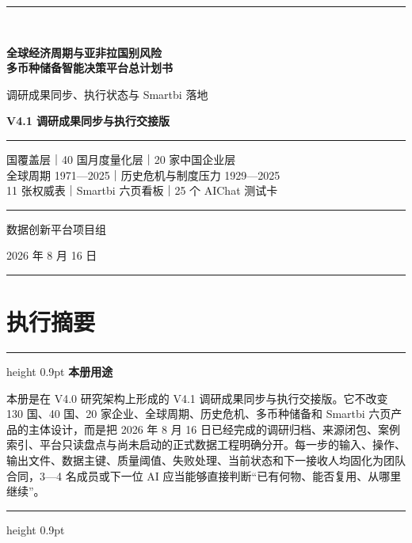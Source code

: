 \documentclass[UTF8,fontset=windows,12pt,openany]{ctexbook}
\newenvironment{decisionbox}[1][]{%
  \par\medskip\noindent\begin{center}\begin{minipage}{0.93\textwidth}%
  \color{OceanBlue}\hrule height 0.9pt\vspace{0.45em}%
  \textbf{#1}\par\smallskip\color{black}%
}{%
  \par\vspace{0.35em}\color{OceanBlue}\hrule height 0.9pt%
  \end{minipage}\end{center}\medskip%
}
\begin{document}
\begin{titlepage}
  \pagecolor{PaleBlue}
  \centering
  \vspace*{1.6cm}
  {\color{OceanBlue}\rule{0.88\textwidth}{1.5pt}}\\[1.05cm]
  {\Huge\bfseries\color{DeepNavy}全球经济周期与亚非拉国别风险\\[0.35cm]多币种储备智能决策平台总计划书\par}
  \vspace{0.7cm}
  {\LARGE\color{OceanBlue}调研成果同步、执行状态与 Smartbi 落地\par}
  \vspace{0.35cm}
  {\Large\bfseries\color{GoldLine}V4.1 调研成果同步与执行交接版\par}
  \vspace{1.0cm}
  \begin{minipage}{0.86\textwidth}
    \color{GoldLine}\rule{\textwidth}{0.9pt}\par\vspace{0.45cm}
    \color{black} 国覆盖层｜40 国月度量化层｜20 家中国企业层\\[0.25cm]
    全球周期 1971—2025｜历史危机与制度压力 1929—2025\\[0.25cm]
    11 张权威表｜Smartbi 六页看板｜25 个 AIChat 测试卡
    \vspace{0.45cm}\par\color{GoldLine}\rule{\textwidth}{0.9pt}
  \end{minipage}
  \vfill
  {\large 数据创新平台项目组\par}
  \vspace{0.25cm}
  {\large 2026 年 8 月 16 日\par}
  \vspace{0.75cm}
  {\color{OceanBlue}\rule{0.88\textwidth}{1.5pt}}
  \nopagecolor
\end{titlepage}

\frontmatter

\chapter*{执行摘要}

\begin{decisionbox}[本册用途]
本册是在 V4.0 研究架构上形成的 V4.1 调研成果同步与执行交接版。它不改变 130 国、40 国、20 家企业、全球周期、历史危机、多币种储备和 Smartbi 六页产品的主体设计，而是把 2026 年 8 月 16 日已经完成的调研归档、来源闭包、案例索引、平台只读盘点与尚未启动的正式数据工程明确分开。每一步的输入、操作、输出文件、数据主键、质量阈值、失败处理、当前状态和下一接收人均固化为团队合同，3—4 名成员或下一位 AI 应当能够直接判断“已有何物、能否复用、从哪里继续”。
\end{decisionbox}
\end{document}
